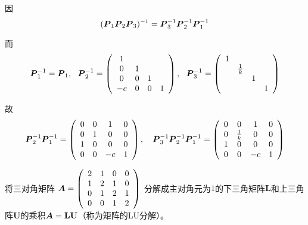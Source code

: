 \begin{jie}[续]
        因
        $$
        (\boldsymbol{P}_1\boldsymbol{P}_2\boldsymbol{P}_3)^{-1} = \boldsymbol{P}_3^{-1}\boldsymbol{P}_2^{-1}\boldsymbol{P}_1^{-1}
        $$
        
        而
        $$
        \boldsymbol{P}_1^{-1} = \boldsymbol{P}_1, ~~
        \boldsymbol{P}_2^{-1} = \left(
        \begin{array}{cccc}
        1& & &  \\
        0&1& &  \\
        0&0&1& \\
        -c&0&0&1
        \end{array}
        \right), ~~
        \boldsymbol{P}_3^{-1} = \left(
        \begin{array}{cccc}
        1& & &  \\
        &\frac1k& &  \\
        & &1& \\
        & & &1
        \end{array}
        \right)
        $$    
        
        故
        $$
        \boldsymbol{P}_2^{-1}\boldsymbol{P}_1^{-1} =   \left(
          \begin{array}{cccc}
            0&0&1&0 \\
            0&1&0&0 \\
            1&0&0&0 \\
            0&0&-c&1
          \end{array}
        \right), \quad  
        \boldsymbol{P}_3^{-1}\boldsymbol{P}_2^{-1}\boldsymbol{P}_1^{-1} =  \left(
          \begin{array}{cccc}
            0&0&1&0 \\
            0&\frac1k&0&0 \\
            1&0&0&0 \\
            0&0&-c&1
          \end{array}
        \right)
        $$
\end{jie}





\begin{li}
  将三对角矩阵
  $
  \boldsymbol{A} = \left(
    \begin{array}{cccc}
      2 & 1 & 0 & 0\\
      1 & 2 & 1 & 0\\
      0 & 1 & 2 & 1\\
      0 & 0 & 1 & 2
    \end{array}
  \right)
  $
  分解成主对角元为$1$的下三角矩阵$\mathbf{L}$和上三角阵$\mathbf{U}$的乘积$\boldsymbol{A}=\mathbf{L}\mathbf{U}$（称为矩阵的LU分解）。
\end{li}




